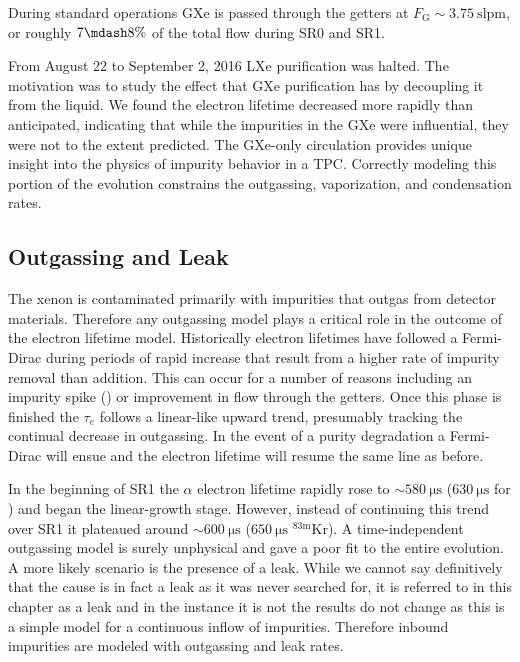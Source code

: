 During standard operations GXe is passed through the getters at $F_{\mathrm{G}} {\sim} 3.75\ \mathrm{slpm}$, or roughly $7 \mdash 8\%$ of
the total flow during SR0 and SR1.

From August 22 to September 2, 2016 LXe purification was halted.  The motivation was to study the effect that GXe purification has by
decoupling it from the liquid.  We found the electron lifetime decreased more rapidly than anticipated, indicating that while the
impurities in the GXe were influential, they were not to the extent predicted.  The GXe-only circulation provides unique insight into
the physics of impurity behavior in a TPC.  Correctly modeling this portion of the evolution constrains the outgassing, vaporization,
and condensation rates.



\subsection{Outgassing and Leak}
\label{subsec:electron_lifetime_model_outgassing}
The xenon is contaminated primarily with impurities that outgas from detector materials.  Therefore any outgassing model plays a
critical role in the outcome of the electron lifetime model.  Historically electron lifetimes have followed a Fermi-Dirac during periods
of rapid increase that result from a higher rate of impurity
removal than addition.  This can occur for a number of reasons including an impurity spike
() or improvement in flow through the getters.  Once this phase is
finished the $\tau_e$ follows a linear-like upward trend, presumably tracking the continual decrease in outgassing.  In the event of a
purity degradation a Fermi-Dirac will ensue and the electron lifetime will resume the same line as before.

In the beginning of SR1 the $\alpha$ electron lifetime rapidly rose to ${\sim} 580\ \mathrm{\mu s}$ ($630\ \mathrm{\mu s}$ for \metakr)
and began the linear-growth stage.  However, instead of continuing this trend over SR1
it plateaued around ${\sim} 600\ \mathrm{\mu s}$ ($650\ \mathrm{\mu s}$ $\mathrm{^{83m}Kr}$).  A time-independent outgassing model is
surely unphysical and
gave a poor fit to the entire evolution.  A more likely scenario is the presence of a leak.  While we cannot say definitively that the
cause is in fact a leak as it was never searched for, it is referred to in this chapter as a leak and in the instance it is not the
results do not change as this is a simple model for a continuous inflow of impurities.  Therefore inbound impurities are modeled with
outgassing and leak rates.



